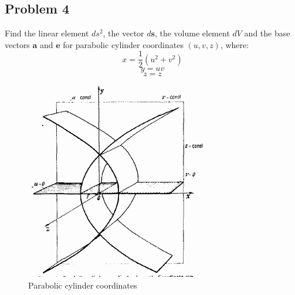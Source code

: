 \documentclass{article}
\begin{document}
\subsection{Problem 4}
Find the linear element $ds^2$, the vector $d\bm{s}$, the volume element $dV$ and the base vectors $\bm{a}$ and $\bm{e}$ for parabolic cylinder coordinates $(u,v,z)$, where:
\begin{equation}
    x=\frac{1}{2}(u^2+v^2)
\end{equation}
\begin{equation}
    y=uv
\end{equation}
\begin{equation}
    z=z
\end{equation}
\begin{figure}[h]
    \centering
    \includegraphics[scale=0.75]{4}
    \caption{Parabolic cylinder coordinates}
    \label{fig:my_label}
\end{figure}
  
\end{document}
